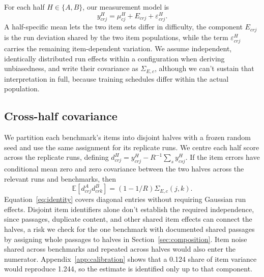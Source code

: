 \documentclass{article}
\begin{document}
For each half $H\in\{A,B\}$, our measurement model is
\begin{equation}
y^H_{crj}=\mu^H_{cj}+E_{crj}+\varepsilon^H_{crj}.
\end{equation}
A half-specific mean lets the two item sets differ in difficulty, the component $E_{crj}$ is the run deviation shared by the two item populations, while the term $\varepsilon^H_{crj}$ carries the remaining item-dependent variation. We assume independent, identically distributed run effects within a configuration when deriving unbiasedness, and write their covariance as $\Sigma_{E,c}$, although we can't sustain that interpretation in full, because training schedules differ within the actual population.

\subsection{Cross-half covariance}
We partition each benchmark's items into disjoint halves with a frozen random seed and use the same assignment for its replicate runs. We centre each half score across the replicate runs, defining $d^H_{crj}=y^H_{crj}-R^{-1}\sum_s y^H_{csj}$. If the item errors have conditional mean zero and zero covariance between the two halves across the relevant runs and benchmarks, then
\begin{equation}
\mathbb{E}[d^A_{crj}d^B_{crk}]=(1-1/R)\Sigma_{E,c}(j,k).
\label{eq:identity}
\end{equation}
Equation~\ref{eq:identity} covers diagonal entries without requiring Gaussian run effects. Disjoint item identifiers alone don't establish the required independence, since passages, duplicate content, and other shared item effects can connect the halves, a risk we check for the one benchmark with documented shared passages by assigning whole passages to halves in Section~\ref{sec:composition}. Item noise shared across benchmarks and repeated across halves would also enter the numerator. Appendix~\ref{app:calibration} shows that a 0.124 share of item variance would reproduce 1.244, so the estimate is identified only up to that component.
\end{document}
